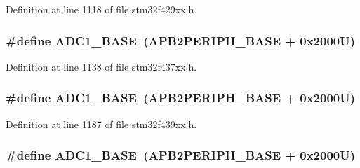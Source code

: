 Definition at line 1118 of file stm32f429xx.\+h.

\subsubsection[{\texorpdfstring{A\+D\+C1\+\_\+\+B\+A\+SE}{ADC1_BASE}}]{\setlength{\rightskip}{0pt plus 5cm}\#define A\+D\+C1\+\_\+\+B\+A\+SE~({\bf A\+P\+B2\+P\+E\+R\+I\+P\+H\+\_\+\+B\+A\+SE} + 0x2000\+U)}\hypertarget{group___peripheral__memory__map_ga695c9a2f892363a1c942405c8d351b91}{}\label{group___peripheral__memory__map_ga695c9a2f892363a1c942405c8d351b91}


Definition at line 1138 of file stm32f437xx.\+h.

\subsubsection[{\texorpdfstring{A\+D\+C1\+\_\+\+B\+A\+SE}{ADC1_BASE}}]{\setlength{\rightskip}{0pt plus 5cm}\#define A\+D\+C1\+\_\+\+B\+A\+SE~({\bf A\+P\+B2\+P\+E\+R\+I\+P\+H\+\_\+\+B\+A\+SE} + 0x2000\+U)}\hypertarget{group___peripheral__memory__map_ga695c9a2f892363a1c942405c8d351b91}{}\label{group___peripheral__memory__map_ga695c9a2f892363a1c942405c8d351b91}


Definition at line 1187 of file stm32f439xx.\+h.

\subsubsection[{\texorpdfstring{A\+D\+C1\+\_\+\+B\+A\+SE}{ADC1_BASE}}]{\setlength{\rightskip}{0pt plus 5cm}\#define A\+D\+C1\+\_\+\+B\+A\+SE~({\bf A\+P\+B2\+P\+E\+R\+I\+P\+H\+\_\+\+B\+A\+SE} + 0x2000\+U)}\hypertarget{group___peripheral__memory__map_ga695c9a2f892363a1c942405c8d351b91}{}\label{group___peripheral__memory__map_ga695c9a2f892363a1c942405c8d351b91}


